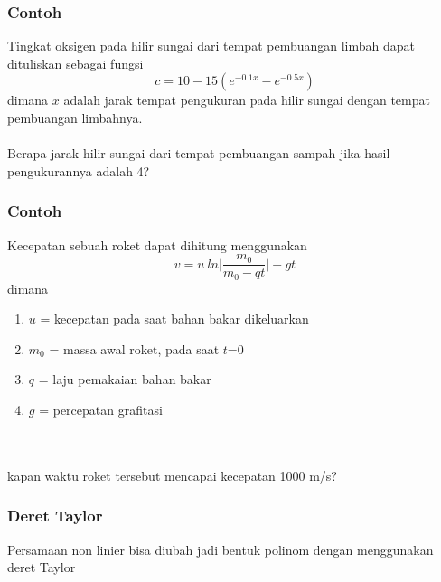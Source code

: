 \documentclass{beamer}
\begin{document}
\begin{frame}
\frametitle{Contoh}
Tingkat oksigen pada hilir sungai dari tempat pembuangan limbah dapat dituliskan sebagai fungsi
\begin{equation}
c = 10 - 15(e^{-0.1x}-e^{-0.5x})
\nonumber
\end{equation}
dimana $x$ adalah jarak tempat pengukuran pada hilir sungai dengan tempat pembuangan limbahnya.
\\\ \\Berapa jarak hilir sungai dari tempat pembuangan sampah jika hasil pengukurannya adalah 4? 
\end{frame}


\begin{frame}
\frametitle{Contoh}
Kecepatan sebuah roket dapat dihitung menggunakan 
\begin{equation}
v = u\ ln\biggl|\dfrac{m_0}{m_0-qt}\biggr| - gt
\nonumber
\end{equation}
dimana 
\begin{enumerate}
\item $u$ = kecepatan pada saat bahan bakar dikeluarkan
\item $m_0$ = massa awal roket, pada saat $t$=0
\item $q$ = laju pemakaian bahan bakar
\item $g$ = percepatan grafitasi
\end{enumerate}
\ \\\ \\kapan waktu roket tersebut mencapai kecepatan 1000 m/s?
\end{frame}


\begin{frame}
\frametitle{Deret Taylor}
Persamaan non linier bisa diubah jadi bentuk polinom dengan menggunakan deret Taylor
\end{frame}

\end{document}
